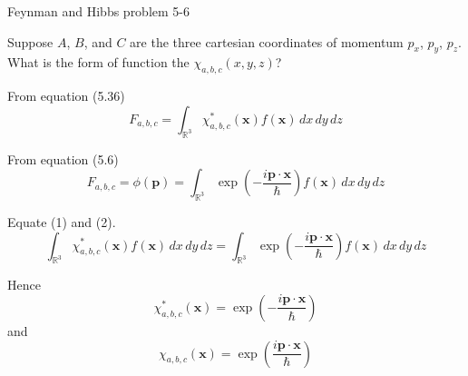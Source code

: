 \documentclass[12pt]{article}
\newcommand\INT{\int_{\mathbb R^3}}
\begin{document}
\begin{center}
Feynman and Hibbs problem 5-6
\end{center}

Suppose $A$, $B$, and $C$ are the three cartesian coordinates
of momentum $p_x$, $p_y$, $p_z$.
What is the form of function the $\chi_{a,b,c}(x,y,z)$?

\bigskip
From equation (5.36)
\begin{equation*}
F_{a,b,c}=\INT\chi_{a,b,c}^*(\mathbf x)f(\mathbf x)\,dx\,dy\,dz
\tag{1}
\end{equation*}

From equation (5.6)
\begin{equation*}
F_{a,b,c}=\phi(\mathbf p)=\INT\exp\left(-\frac{i\mathbf p\cdot\mathbf x}{\hbar}\right)f(\mathbf x)\,dx\,dy\,dz
\tag{2}
\end{equation*}

Equate (1) and (2).
\begin{equation*}
\INT\chi_{a,b,c}^*(\mathbf x)f(\mathbf x)\,dx\,dy\,dz
=\INT\exp\left(-\frac{i\mathbf p\cdot\mathbf x}{\hbar}\right)f(\mathbf x)\,dx\,dy\,dz
\end{equation*}

Hence
\begin{equation*}
\chi_{a,b,c}^*(\mathbf x)=\exp\left(-\frac{i\mathbf p\cdot\mathbf x}{\hbar}\right)
\end{equation*}
and
\begin{equation*}
\chi_{a,b,c}(\mathbf x)=\exp\left(\frac{i\mathbf p\cdot\mathbf x}{\hbar}\right)
\end{equation*}
\end{document}
